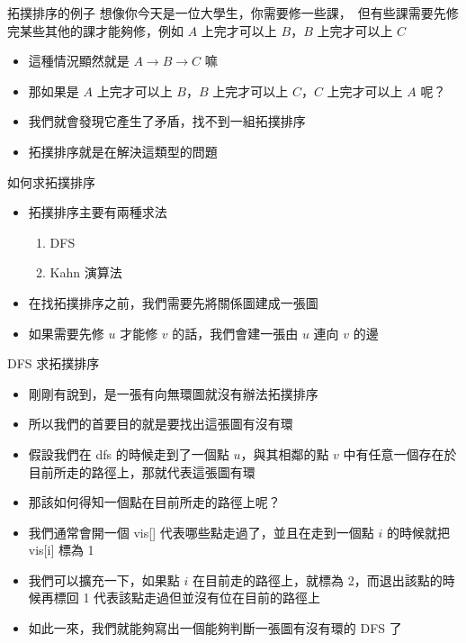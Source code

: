 \documentclass[aspectratio=169]{beamer}
\begin{document}
    \begin{frame}
        \begin{block}{拓撲排序的例子}
            想像你今天是一位大學生，你需要修一些課，\
            但有些課需要先修完某些其他的課才能夠修，例如 $A$ 上完才可以上 $B$，$B$ 上完才可以上 $C$
        \end{block}

        \begin{itemize}
            \item<1-> 這種情況顯然就是 $A\rightarrow B \rightarrow C$ 嘛
            \item<2-> 那如果是 $A$ 上完才可以上 $B$，$B$ 上完才可以上 $C$，$C$ 上完才可以上 $A$ 呢？
            \item<3-> 我們就會發現它產生了矛盾，找不到一組拓撲排序
            \item<4-> 拓撲排序就是在解決這類型的問題
        \end{itemize}
    \end{frame}

    \begin{frame}{如何求拓撲排序}
        \begin{itemize}
            \item<1-> 拓撲排序主要有兩種求法
            \begin{enumerate}
                \item DFS
                \item Kahn 演算法
            \end{enumerate}
            \item<2-> 在找拓撲排序之前，我們需要先將關係圖建成一張圖
            \item<3-> 如果需要先修 $u$ 才能修 $v$ 的話，我們會建一張由 $u$ 連向 $v$ 的邊
        \end{itemize}
    \end{frame}

    \begin{frame}{DFS 求拓撲排序}
        \begin{itemize}
            \item<1-> 剛剛有說到，是一張有向無環圖就沒有辦法拓撲排序
            \item<1-> 所以我們的首要目的就是要找出這張圖有沒有環
            \item<2-> 假設我們在 dfs 的時候走到了一個點 $u$，與其相鄰的點 $v$ 中有任意一個存在於目前所走的路徑上，那就代表這張圖有環
            \item<2-> 那該如何得知一個點在目前所走的路徑上呢？
            \item<3-> 我們通常會開一個 vis[] 代表哪些點走過了，並且在走到一個點 $i$ 的時候就把 vis[i] 標為 1
            \item<4-> 我們可以擴充一下，如果點 $i$ 在目前走的路徑上，就標為 2，而退出該點的時候再標回 1 代表該點走過但並沒有位在目前的路徑上
            \item<5-> 如此一來，我們就能夠寫出一個能夠判斷一張圖有沒有環的 DFS 了
        \end{itemize}
    \end{frame}
\end{document}
